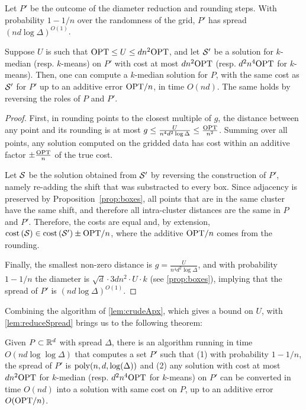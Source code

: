 \begin{lemma}\label{lem:reduceSpread}

Let $P'$ be the outcome of the diameter reduction and rounding steps. With probability $1-1/n$ over the randomness of the grid, $P'$ has spread $(nd \log
\Delta)^{O(1)}$.

Suppose $U$ is such that $\text{OPT} \leq U \leq d n^2 \text{OPT}$, and let $\mathcal S'$ be a solution for $k$-median (resp. $k$-means) on $P'$ with cost at most $d n^2
\text{OPT}$ (resp. $d^2 n^4 \text{OPT}$ for $k$-means). Then, one can compute a $k$-median solution for $P$, with the same cost as $\mathcal S'$ for $P'$ up to an
additive error $\text{OPT} / n$, in time $O(nd)$. The same holds by reversing the roles of $P$ and $P'$.

\end{lemma}
\begin{proof}
First, in rounding points to the closest multiple of $g$, the distance between any point and its rounding is at most $g \leq \frac{U}{n^4 d^2 \log \Delta} \leq
\frac{\text{OPT}}{n^2}$. Summing over all points, any solution computed on the gridded data has cost within an additive factor $\pm \frac{\text{OPT}}{n}$ of the true cost. 


Let $\mathcal S$ be the solution obtained from $\mathcal S'$ by reversing the construction of $P'$, namely re-adding the shift that was substracted to every box. Since
adjacency is preserved by Proposition~\ref{prop:boxes}, all points that are in the same cluster have the same shift, and therefore all intra-cluster distances
are the same in $P$ and $P'$.  Therefore, the costs are equal and, by extension, $\operatorname{cost} \left( \mathcal S \right) \in \operatorname{cost} \left( \mathcal S' \right) \pm \text{OPT} / n$,
where the additive $\text{OPT} /n$ comes from the rounding.

Finally, the smallest non-zero distance is $g = \frac{U}{n^4 d^{2} \log \Delta}$, and with probability $1-1/n$ the diameter is $\sqrt{d} \cdot 3d n^2\cdot
U \cdot k$ (see \cref{prop:boxes}), implying that the spread of $P'$ is $(nd \log \Delta)^{O(1)}$.
\end{proof}

Combining the algorithm of \cref{lem:crudeApx}, which gives a bound on $U$, with \cref{lem:reduceSpread} brings us to the following theorem:

\begin{theorem}

Given $P \subset \mathbb{R}^d$ with spread $\Delta$, there is an algorithm running in time $O(nd \log \log \Delta)$ that computes a set $P'$ such that (1) with
probability $1-1/n$, the spread of $P'$ is $\operatorname{poly}(n,d, \log(\Delta))$ and (2) any solution with cost at most $d n^2 \text{OPT}$ for  $k$-median (resp. $d^2 n^4 \text{OPT}$
for $k$-means) on $P'$ can be converted in time $O(nd)$ into a solution with same cost on $P$, up to an additive error $O(\text{OPT} / n)$.

\end{theorem}

